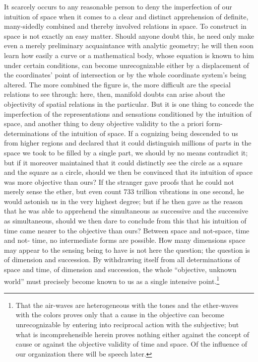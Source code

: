 \documentclass[12pt]{article}
\begin{document}
It scarcely occurs to any reasonable person to deny the imperfection of our
intuition of space when it comes to a clear and distinct apprehension of
definite, many-sidedly combined and thereby involved relations in space. To
construct in space is not exactly an easy matter. Should anyone doubt this,
he need only make even a merely preliminary acquaintance with analytic
geometry; he will then soon learn how easily a curve or a mathematical
body, whose equation is known to him under certain conditions, can become
unrecognizable either by a displacement of the coordinates' point of
intersection or by the whole coordinate system's being altered. The more
combined the figure is, the more difficult are the special relations to see
through: here, then, manifold doubts can arise about the objectivity of
spatial relations in the particular. But it is one thing to concede the
imperfection of the representations and sensations conditioned by the
intuition of space, and another thing to deny objective validity to the a
priori form-determinations of the intuition of space. If a cognizing being
descended to us from higher regions and declared that it could distinguish
millions of parts in the space we took to be filled by a single part, we
should by no means contradict it; but if it moreover maintained that it
could distinctly see the circle as a square and the square as a circle,
should we then be convinced that its intuition of space was more objective
than ours? If the stranger gave proofs that he could not merely sense the
ether, but even count 733 trillion vibrations in one second, he would
astonish us in the very highest degree; but if he then gave as the reason
that he was able to apprehend the simultaneous as successive and the
successive as simultaneous, should we then dare to conclude from this that
his intuition of time came nearer to the objective than ours? Between space
and not-space, time and not-
time, no intermediate forms are possible. How many dimensions space may
appear to the sensing being to have is not here the question; the question
is of dimension and succession. By withdrawing itself from all
determinations of space and time, of dimension and succession, the whole
``objective, unknown world'' must precisely become known to us as a single
intensive point.\footnote{That the air-waves are heterogeneous with the
tones and the ether-waves with the colors proves only that a cause in the
objective can become unrecognizable by entering into reciprocal action with
the subjective; but what is incomprehensible herein proves nothing either
against the concept of cause or against the objective validity of time and
space. Of the influence of our organization there will be speech later.}
\end{document}

